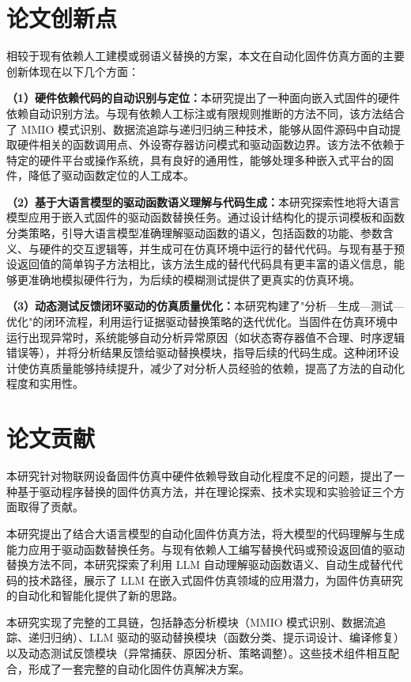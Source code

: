 \section{论文创新点}
\label{sec:innovation}

相较于现有依赖人工建模或弱语义替换的方案，本文在自动化固件仿真方面的主要创新体现在以下几个方面：

\textbf{（1）硬件依赖代码的自动识别与定位：}本研究提出了一种面向嵌入式固件的硬件依赖自动识别方法。与现有依赖人工标注或有限规则推断的方法不同，该方法结合了 MMIO 模式识别、数据流追踪与递归归纳三种技术，能够从固件源码中自动提取硬件相关的函数调用点、外设寄存器访问模式和驱动函数边界。该方法不依赖于特定的硬件平台或操作系统，具有良好的通用性，能够处理多种嵌入式平台的固件，降低了驱动函数定位的人工成本。

\textbf{（2）基于大语言模型的驱动函数语义理解与代码生成：}本研究探索性地将大语言模型应用于嵌入式固件的驱动函数替换任务。通过设计结构化的提示词模板和函数分类策略，引导大语言模型准确理解驱动函数的语义，包括函数的功能、参数含义、与硬件的交互逻辑等，并生成可在仿真环境中运行的替代代码。与现有基于预设返回值的简单钩子方法相比，该方法生成的替代代码具有更丰富的语义信息，能够更准确地模拟硬件行为，为后续的模糊测试提供了更真实的仿真环境。

\textbf{（3）动态测试反馈闭环驱动的仿真质量优化：}本研究构建了"分析—生成—测试—优化"的闭环流程，利用运行证据驱动替换策略的迭代优化。当固件在仿真环境中运行出现异常时，系统能够自动分析异常原因（如状态寄存器值不合理、时序逻辑错误等），并将分析结果反馈给驱动替换模块，指导后续的代码生成。这种闭环设计使仿真质量能够持续提升，减少了对分析人员经验的依赖，提高了方法的自动化程度和实用性。

\section{论文贡献}
\label{sec:thesis-contribution}

本研究针对物联网设备固件仿真中硬件依赖导致自动化程度不足的问题，提出了一种基于驱动程序替换的固件仿真方法，并在理论探索、技术实现和实验验证三个方面取得了贡献。

本研究提出了结合大语言模型的自动化固件仿真方法，将大模型的代码理解与生成能力应用于驱动函数替换任务。与现有依赖人工编写替换代码或预设返回值的驱动替换方法不同，本研究探索了利用 LLM 自动理解驱动函数语义、自动生成替代代码的技术路径，展示了 LLM 在嵌入式固件仿真领域的应用潜力，为固件仿真研究的自动化和智能化提供了新的思路。

本研究实现了完整的工具链，包括静态分析模块（MMIO 模式识别、数据流追踪、递归归纳）、LLM 驱动的驱动替换模块（函数分类、提示词设计、编译修复）以及动态测试反馈模块（异常捕获、原因分析、策略调整）。这些技术组件相互配合，形成了一套完整的自动化固件仿真解决方案。

